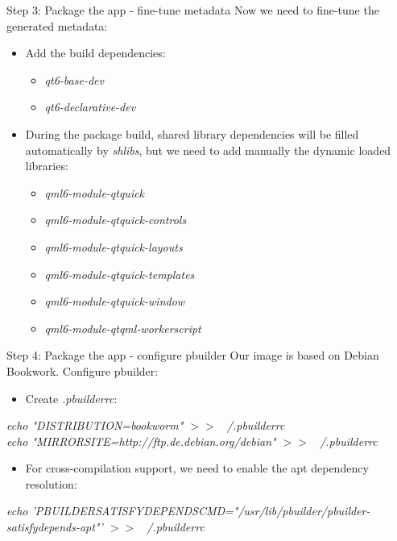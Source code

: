 \documentclass{beamer}
\begin{document}
\begin{frame}{Step 3: Package the app - fine-tune metadata}
	Now we need to fine-tune the generated metadata:
	\begin{itemize}
		\item Add the build dependencies:
		\begin{itemize}
			\item \emph{qt6-base-dev}
			\item \emph{qt6-declarative-dev}
		\end{itemize}
		\item During the package build, shared library dependencies will be filled automatically by \emph{shlibs}, but we need to add manually the dynamic loaded libraries:
		\begin{itemize}
			\item \emph{qml6-module-qtquick}
			\item \emph{qml6-module-qtquick-controls}
			\item \emph{qml6-module-qtquick-layouts}
			\item \emph{qml6-module-qtquick-templates}
			\item \emph{qml6-module-qtquick-window}
			\item \emph{qml6-module-qtqml-workerscript}
		\end{itemize}
	\end{itemize}
\end{frame}

\begin{frame}{Step 4: Package the app - configure pbuilder}
	Our image is based on Debian Bookwork. Configure pbuilder:
	\begin{itemize}
		\item Create \emph{.pbuilderrc}:
	\end{itemize}
	
	\small{\emph{echo "DISTRIBUTION=bookworm" $>>$ ~/.pbuilderrc} \\
	\emph{echo "MIRRORSITE=http://ftp.de.debian.org/debian" $>>$ ~/.pbuilderrc}}
	
	\begin{itemize}
		\item For cross-compilation support, we need to enable the apt dependency resolution:
	\end{itemize}
	\small{\emph{echo 'PBUILDERSATISFYDEPENDSCMD="/usr/lib/pbuilder/pbuilder-satisfydepends-apt"' $>>$ ~/.pbuilderrc}}
\end{frame}
\end{document}
